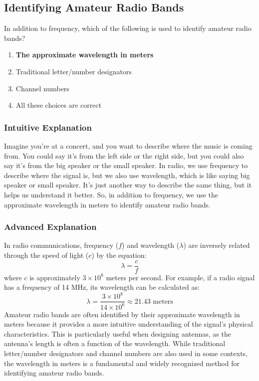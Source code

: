 \subsection{Identifying Amateur Radio Bands}
\label{T3B07}

\begin{tcolorbox}[colback=gray!10!white,colframe=black!75!black,title=T3B07]
In addition to frequency, which of the following is used to identify amateur radio bands?
\begin{enumerate}[label=\Alph*)]
    \item \textbf{The approximate wavelength in meters}
    \item Traditional letter/number designators
    \item Channel numbers
    \item All these choices are correct
\end{enumerate}
\end{tcolorbox}

\subsubsection*{Intuitive Explanation}
Imagine you're at a concert, and you want to describe where the music is coming from. You could say it's from the left side or the right side, but you could also say it's from the big speaker or the small speaker. In radio, we use frequency to describe where the signal is, but we also use wavelength, which is like saying big speaker or small speaker. It's just another way to describe the same thing, but it helps us understand it better. So, in addition to frequency, we use the approximate wavelength in meters to identify amateur radio bands.

\subsubsection*{Advanced Explanation}
In radio communications, frequency ($f$) and wavelength ($\lambda$) are inversely related through the speed of light ($c$) by the equation:
\[
\lambda = \frac{c}{f}
\]
where $c$ is approximately $3 \times 10^8$ meters per second. For example, if a radio signal has a frequency of 14 MHz, its wavelength can be calculated as:
\[
\lambda = \frac{3 \times 10^8}{14 \times 10^6} \approx 21.43 \text{ meters}
\]
Amateur radio bands are often identified by their approximate wavelength in meters because it provides a more intuitive understanding of the signal's physical characteristics. This is particularly useful when designing antennas, as the antenna's length is often a function of the wavelength. While traditional letter/number designators and channel numbers are also used in some contexts, the wavelength in meters is a fundamental and widely recognized method for identifying amateur radio bands.

